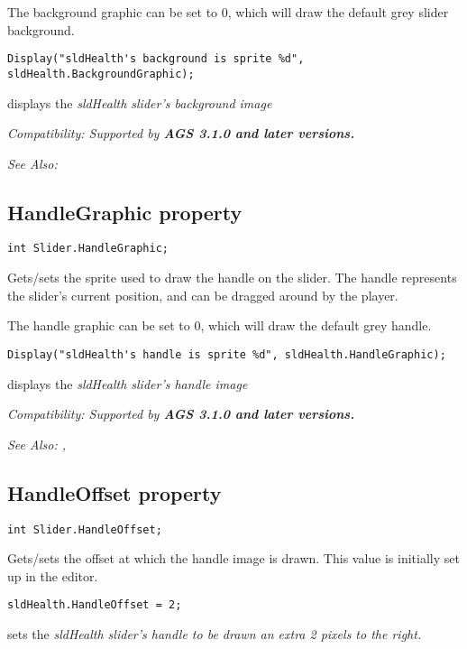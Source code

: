 The background graphic can be set to 0, which will draw the default grey slider background.

\begin{verbatim}
Display("sldHealth's background is sprite %d", sldHealth.BackgroundGraphic);
\end{verbatim}
displays the \it{sldHealth} slider's background image

\it{Compatibility:} Supported by \bf{AGS 3.1.0} and later versions.

\it{See Also:} 


\subsection{HandleGraphic property}\label{Slider.HandleGraphic}%

\begin{verbatim}
int Slider.HandleGraphic;
\end{verbatim}
Gets/sets the sprite used to draw the handle on the slider. The handle represents the
slider's current position, and can be dragged around by the player.

The handle graphic can be set to 0, which will draw the default grey handle.

\begin{verbatim}
Display("sldHealth's handle is sprite %d", sldHealth.HandleGraphic);
\end{verbatim}
displays the \it{sldHealth} slider's handle image

\it{Compatibility:} Supported by \bf{AGS 3.1.0} and later versions.

\it{See Also:} ,


\subsection{HandleOffset property}\label{Slider.HandleOffset}%

\begin{verbatim}
int Slider.HandleOffset;
\end{verbatim}
Gets/sets the offset at which the handle image is drawn. This value is initially
set up in the editor.

\begin{verbatim}
sldHealth.HandleOffset = 2;
\end{verbatim}
sets the \it{sldHealth} slider's handle to be drawn an extra 2 pixels to the right.

